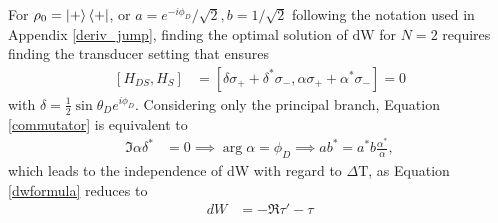 For $\rho_0 = \ket{+} \bra{+}$, or $a = e^{-i \phi_D}/\sqrt{2}, b = 1/\sqrt{2}$ following the notation used in Appendix \ref{deriv_jump}, finding the optimal solution of $\mathrm{dW}$ for $N = 2$ requires finding the transducer setting that ensures
\begin{align}\label{commutator}
	[H_{DS}, H_S] &= [\delta \sigma_{+} + \delta^* \sigma_{-}, \alpha \sigma_{+} + \alpha^* \sigma_{-}] = 0
\end{align}
with $\delta = \frac{1}{2} \sin{\theta_D} e^{i \phi_D}$.
Considering only the principal branch, Equation \ref{commutator} is equivalent to
\begin{align*}
	\Im{\alpha \delta^*} &= 0 \implies \arg{\alpha} = \phi_D \implies a b^* = a^* b \frac{\alpha^*}{\alpha},
\end{align*}
which leads to the independence of dW with regard to $\Delta \mathrm{T}$, as Equation \ref{dwformula} reduces to
\begin{align*}
	dW &= - \Re{\tau' - \tau}
\end{align*}